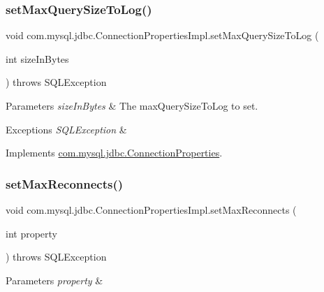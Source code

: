 \subsubsection{\texorpdfstring{set\+Max\+Query\+Size\+To\+Log()}{setMaxQuerySizeToLog()}}
{\footnotesize\ttfamily void com.\+mysql.\+jdbc.\+Connection\+Properties\+Impl.\+set\+Max\+Query\+Size\+To\+Log (\begin{DoxyParamCaption}\item[{int}]{size\+In\+Bytes }\end{DoxyParamCaption}) throws S\+Q\+L\+Exception}


\begin{DoxyParams}{Parameters}
{\em size\+In\+Bytes} & The max\+Query\+Size\+To\+Log to set. \\
\hline
\end{DoxyParams}

\begin{DoxyExceptions}{Exceptions}
{\em S\+Q\+L\+Exception} & \\
\hline
\end{DoxyExceptions}


Implements \mbox{\hyperlink{interfacecom_1_1mysql_1_1jdbc_1_1_connection_properties_a65e15e4e1644fe1fb818777977237944}{com.\+mysql.\+jdbc.\+Connection\+Properties}}.

\mbox{\label{classcom_1_1mysql_1_1jdbc_1_1_connection_properties_impl_a240be4b60c27f02489e6b7b0b50a7e8a}} 
\subsubsection{\texorpdfstring{set\+Max\+Reconnects()}{setMaxReconnects()}}
{\footnotesize\ttfamily void com.\+mysql.\+jdbc.\+Connection\+Properties\+Impl.\+set\+Max\+Reconnects (\begin{DoxyParamCaption}\item[{int}]{property }\end{DoxyParamCaption}) throws S\+Q\+L\+Exception}


\begin{DoxyParams}{Parameters}
{\em property} & \\
\hline
\end{DoxyParams}

